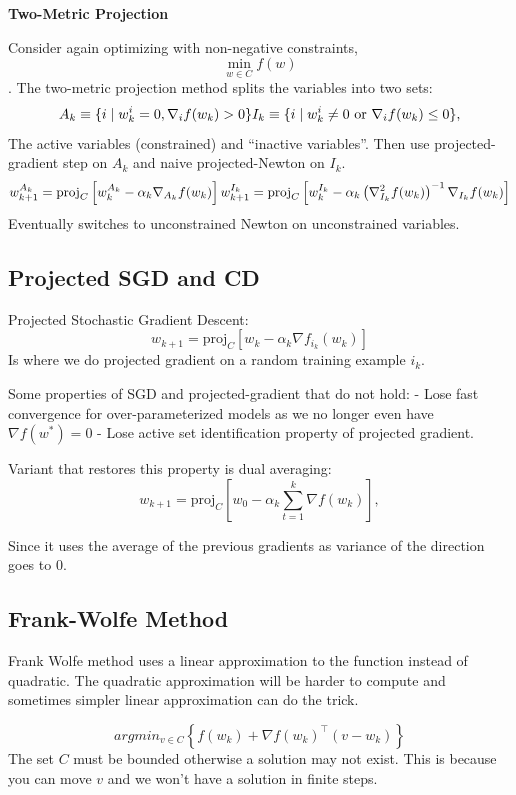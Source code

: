 \documentclass[
]{article}
\begin{document}
\textbf{Two-Metric Projection}

Consider again optimizing with non-negative constraints, \[ \min_{w \in C} f(w) \].
The two-metric projection method splits the variables into two sets:
\[
A_k \equiv \{ i \mid w_k^i = 0, \nabla_i f(w_k) > 0 \}\\
I_k \equiv \{ i \mid w_k^i \neq 0 \text{ or } \nabla_i f(w_k) \leq 0 \},
\]
The active variables (constrained) and ``inactive variables''. Then use projected-gradient step on \(A_k\) and naive projected-Newton on \(I_k\).
\[
w_{k+1}^{A_k} = \text{proj}_C \left[ w_k^{A_k} - \alpha_k \nabla_{A_k} f(w_k) \right] \\
w_{k+1}^{I_k} = \text{proj}_C \left[ w_k^{I_k} - \alpha_k \left( \nabla_{I_k}^2 f(w_k) \right)^{-1} \nabla_{I_k} f(w_k) \right]
\]
Eventually switches to unconstrained Newton on unconstrained variables.

\subsection{Projected SGD and CD}\label{projected-sgd-and-cd}

Projected Stochastic Gradient Descent:
\[
w_{k+1} = \text{proj}_C \left[ w_k - \alpha_k \nabla f_{i_k}(w_k) \right]
\]
Is where we do projected gradient on a random training example \(i_k\).

Some properties of SGD and projected-gradient that do not hold:
- Lose fast convergence for over-parameterized models as we no longer even have \(\nabla f(w^*) = 0\)
- Lose active set identification property of projected gradient.

Variant that restores this property is dual averaging:
\[
w_{k+1} = \text{proj}_C \left[ w_0 - \alpha_k \sum_{t=1}^k \nabla f(w_k) \right],
\]

Since it uses the average of the previous gradients as variance of the direction goes to 0.

\subsection{Frank-Wolfe Method}\label{frank-wolfe-method}

Frank Wolfe method uses a linear approximation to the function instead of quadratic. The quadratic approximation will be harder to compute and sometimes simpler linear approximation can do the trick.

\[
argmin_{ v \in C} \left\{ f(w_k) + \nabla f(w_k)^\top (v - w_k) \right\}
\]
The set \(C\) must be bounded otherwise a solution may not exist. This is because you can move \(v\) and we won't have a solution in finite steps.
\end{document}
